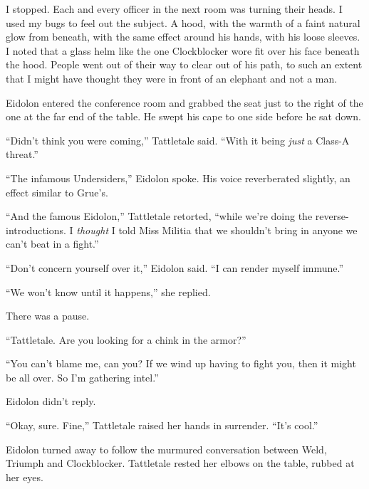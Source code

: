 I stopped.  Each and every officer in the next room was turning their heads.  I used my bugs to feel out the subject.  A hood, with the warmth of a faint natural glow from beneath, with the same effect around his hands, with his loose sleeves.  I noted that a glass helm like the one Clockblocker wore fit over his face beneath the hood.  People went out of their way to clear out of his path, to such an extent that I might have thought they were in front of an elephant and not a man.



Eidolon entered the conference room and grabbed the seat just to the right of the one at the far end of the table.  He swept his cape to one side before he sat down.



``Didn't think you were coming,'' Tattletale said.  ``With it being \emph{just} a Class-A threat.''



``The infamous Undersiders,'' Eidolon spoke.  His voice reverberated slightly, an effect similar to Grue's.



``And the famous Eidolon,'' Tattletale retorted, ``while we're doing the reverse-introductions.      I \emph{thought} I told Miss Militia that we shouldn't bring in anyone we can't beat in a fight.''



``Don't concern yourself over it,'' Eidolon said.  ``I can render myself immune.''



``We won't know until it happens,'' she replied.



There was a pause.



``Tattletale.  Are you looking for a chink in the armor?''



``You can't blame me, can you?  If we wind up having to fight you, then it might be all over.  So I'm gathering intel.''



Eidolon didn't reply.



``Okay, sure.  Fine,'' Tattletale raised her hands in surrender.  ``It's cool.''



Eidolon turned away to follow the murmured conversation between Weld, Triumph and Clockblocker.  Tattletale rested her elbows on the table, rubbed at her eyes.



